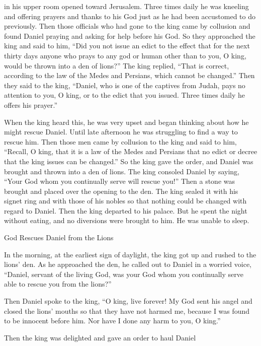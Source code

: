 {in his upper room
opened
toward
Jerusalem.
Three
times
daily
he was
kneeling
and offering prayers
and thanks
to
his God
just as
he had been accustomed
to do
previously.
Then
those
officials
who had gone to the king came by collusion
and found
Daniel
praying
and asking for help
before
his God.
So
they approached
the king
and said
to
him, “Did you not
issue
an edict
to the effect
that
for the next
thirty
days
anyone
who
prays
to
any
god
or human
other
than to
you, O king,
would be thrown into
a den
of lions?” The king
replied,
“That
is correct,
according to the law
of the Medes
and Persians,
which
cannot
be changed.”
Then
they said
to
the king,
“Daniel,
who
is one of
the captives
from Judah,
pays
no
attention
to
you, O king,
or to
the edict
that
you issued.
Three
times
daily
he offers
his prayer.”
\par }{\PP {}When
the king
heard
this,
he was very
upset
and began
thinking
about
how
he might rescue
Daniel.
Until
late afternoon
he was
struggling
to find a way to rescue him.
Then
those
men
came by collusion
to
the king
and said
to him, “Recall,
O king,
that
it is a law
of the Medes
and Persians
that
no
edict
or decree
that
the king
issues
can be changed.”
So
the king
gave the order,
and Daniel
was brought
and thrown into
a den
of lions.
The king
consoled
Daniel
by saying,
“Your God
whom
you
continually
serve
will
rescue you!”
Then a
stone
was brought
and placed
over
the opening
to the den.
The king
sealed
it with his signet ring
and with those
of his nobles
so that
nothing
could be changed
with regard
to Daniel.
Then
the king
departed
to his palace.
But he spent the night
without eating,
and no
diversions
were brought to
him. He was unable
to sleep.
\par }{\SH God Rescues Daniel from the Lions
\par }{\PP {}In the morning,
at the earliest sign of daylight,
the king
got up
and rushed
to
the lions’
den.
As he approached
the den,
he called out
to Daniel
in a worried
voice, “Daniel,
servant
of the living
God,
was your God
whom
you
continually
serve
able
to rescue
you from
the lions?”
\par }{\PP {}Then
Daniel
spoke
to
the king,
“O king,
live
forever!
My God
sent
his angel
and closed
the lions’
mouths
so that they have not
harmed
me, because
I was found
to be innocent
before
him. Nor
have I done
any harm
to you, O king.”
\par }{\PP {}Then
the king
was
delighted
and gave an order
to
haul
Daniel
}
